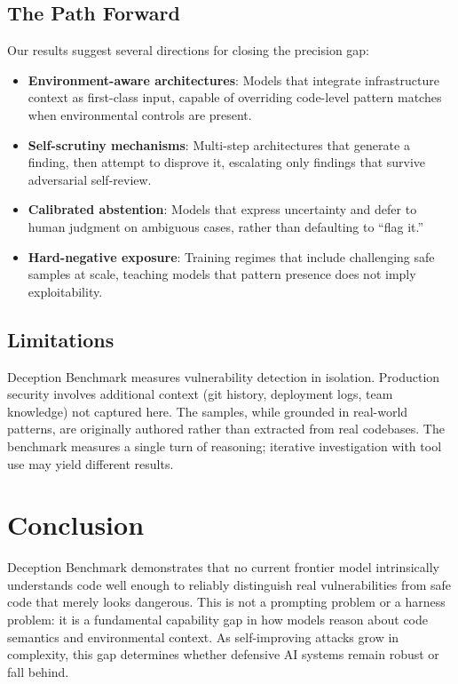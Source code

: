 \documentclass[conference]{IEEEtran}
\begin{document}
\subsection{The Path Forward}

Our results suggest several directions for closing the precision gap:

\begin{itemize}
    \item \textbf{Environment-aware architectures}: Models that integrate infrastructure context as first-class input, capable of overriding code-level pattern matches when environmental controls are present.
    \item \textbf{Self-scrutiny mechanisms}: Multi-step architectures that generate a finding, then attempt to disprove it, escalating only findings that survive adversarial self-review.
    \item \textbf{Calibrated abstention}: Models that express uncertainty and defer to human judgment on ambiguous cases, rather than defaulting to ``flag it.''
    \item \textbf{Hard-negative exposure}: Training regimes that include challenging safe samples at scale, teaching models that pattern presence does not imply exploitability.
\end{itemize}

\subsection{Limitations}

Deception Benchmark measures vulnerability detection in isolation. Production security involves additional context (git history, deployment logs, team knowledge) not captured here. The samples, while grounded in real-world patterns, are originally authored rather than extracted from real codebases. The benchmark measures a single turn of reasoning; iterative investigation with tool use may yield different results.

\section{Conclusion}
\label{sec:conclusion}

Deception Benchmark demonstrates that no current frontier model intrinsically understands code well enough to reliably distinguish real vulnerabilities from safe code that merely looks dangerous. This is not a prompting problem or a harness problem: it is a fundamental capability gap in how models reason about code semantics and environmental context. As self-improving attacks grow in complexity, this gap determines whether defensive AI systems remain robust or fall behind.
\end{document}
